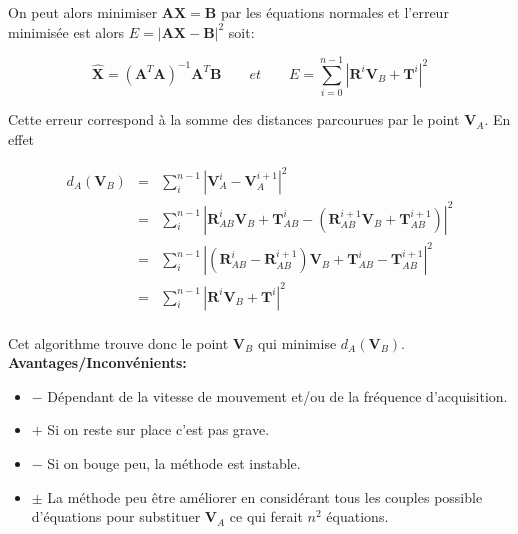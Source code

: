 \documentclass[12pt,a4paper]{article}
\begin{document}
	On peut alors minimiser $\mathbf{A}\mathbf{X}=\mathbf{B}$ par les équations normales et l'erreur minimisée est alors $E=|\mathbf{A}\mathbf{X}-\mathbf{B}|^2$ soit:
	
	\[
	\boxed{\hat{\mathbf{X}}=(\mathbf{A}^T\mathbf{A})^{-1} \mathbf{A}^T \mathbf{B}}
	\qquad et \qquad \boxed{E=\sum_{i=0}^{n-1} |\mathbf{R}^i \mathbf{V}_B+\mathbf{T}^i|^2}
	\]
	
	Cette erreur correspond à la somme des distances parcourues par le point $\mathbf{V}_A$. En effet 
	
	\begin{eqnarray*}
		d_A(\mathbf{V}_B) &=& \sum_i^{n-1} |\mathbf{V}_A^{i}-\mathbf{V}_A^{i+1}|^2\\
		&=&\sum_i^{n-1} | \mathbf{R}_{AB}^{i} \mathbf{V}_B +\mathbf{T}^{i}_{AB}-(\mathbf{R}_{AB}^{i+1} \mathbf{V}_B +\mathbf{T}^{i+1}_{AB})|^2 \\
		&=&\sum_i^{n-1} | (\mathbf{R}_{AB}^{i}-\mathbf{R}_{AB}^{i+1}) \mathbf{V}_B +\mathbf{T}^{i}_{AB}- \mathbf{T}^{i+1}_{AB}|^2 \\
		&=&\sum_i^{n-1} | \mathbf{R}^{i} \mathbf{V}_B +\mathbf{T}^{i}|^2 \\
	\end{eqnarray*}	
	
	Cet algorithme trouve donc le point $\mathbf{V}_B$ qui minimise $d_A(\mathbf{V}_B)$.\\
	
	
	\textbf{Avantages/Inconvénients:}
	\begin{itemize}
		\item $-$ Dépendant de la vitesse de mouvement et/ou de la fréquence d'acquisition.
		\item $+$ Si on reste sur place c'est pas grave.
		\item $-$ Si on bouge peu, la méthode est instable.
		\item $\pm$ La méthode peu être améliorer en considérant tous les couples possible d'équations pour substituer $\mathbf{V}_A$ ce qui ferait $n^2$ équations.
	\end{itemize} 
\end{document}
